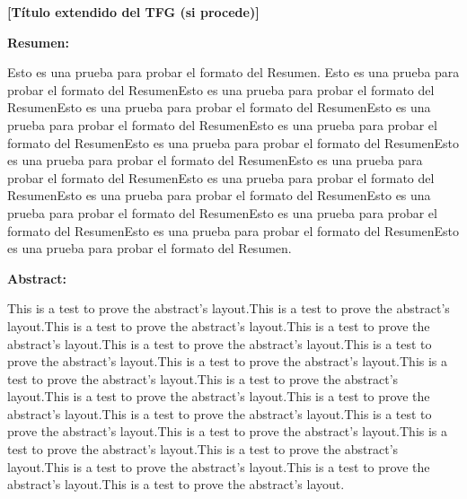 \newpage

{\bfseries \large [Título extendido del TFG (si procede)] }\vspace{10mm} 

{\bfseries \large Resumen:} \vspace{5mm}

Esto es una prueba para probar el formato del Resumen. Esto es una prueba para probar el formato del ResumenEsto es una prueba para probar el formato del ResumenEsto es una prueba para probar el formato del ResumenEsto es una prueba para probar el formato del ResumenEsto es una prueba para probar el formato del ResumenEsto es una prueba para probar el formato del ResumenEsto es una prueba para probar el formato del ResumenEsto es una prueba para probar el formato del ResumenEsto es una prueba para probar el formato del ResumenEsto es una prueba para probar el formato del ResumenEsto es una prueba para probar el formato del ResumenEsto es una prueba para probar el formato del ResumenEsto es una prueba para probar el formato del ResumenEsto es una prueba para probar el formato del Resumen.
\vspace{1cm}

{\bfseries \large Abstract: }\vspace{5mm} 

This is a test to prove the abstract's layout.This is a test to prove the abstract's layout.This is a test to prove the abstract's layout.This is a test to prove the abstract's layout.This is a test to prove the abstract's layout.This is a test to prove the abstract's layout.This is a test to prove the abstract's layout.This is a test to prove the abstract's layout.This is a test to prove the abstract's layout.This is a test to prove the abstract's layout.This is a test to prove the abstract's layout.This is a test to prove the abstract's layout.This is a test to prove the abstract's layout.This is a test to prove the abstract's layout.This is a test to prove the abstract's layout.This is a test to prove the abstract's layout.This is a test to prove the abstract's layout.This is a test to prove the abstract's layout.This is a test to prove the abstract's layout.
\vspace{1cm}